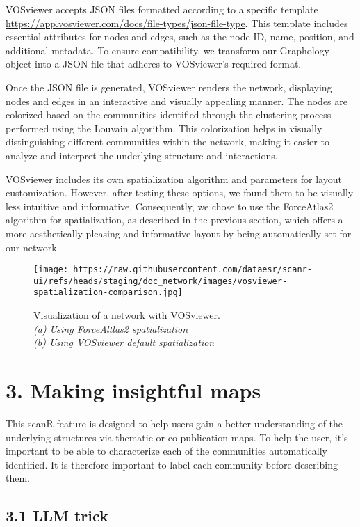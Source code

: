 \documentclass[
]{article}
\begin{document}
VOSviewer accepts JSON files formatted according to a specific template
\url{https://app.vosviewer.com/docs/file-types/json-file-type}. This
template includes essential attributes for nodes and edges, such as the
node ID, name, position, and additional metadata. To ensure
compatibility, we transform our Graphology object into a JSON file that
adheres to VOSviewer's required format.

Once the JSON file is generated, VOSviewer renders the network,
displaying nodes and edges in an interactive and visually appealing
manner. The nodes are colorized based on the communities identified
through the clustering process performed using the Louvain algorithm.
This colorization helps in visually distinguishing different communities
within the network, making it easier to analyze and interpret the
underlying structure and interactions.

VOSviewer includes its own spatialization algorithm and parameters for
layout customization. However, after testing these options, we found
them to be visually less intuitive and informative. Consequently, we
chose to use the ForceAtlas2 algorithm for spatialization, as described
in the previous section, which offers a more aesthetically pleasing and
informative layout by being automatically set for our network.

\begin{figure}
\centering
\texttt{[image: https://raw.githubusercontent.com/dataesr/scanr-ui/refs/heads/staging/doc\_network/images/vosviewer-spatialization-comparison.jpg]}
\caption{Visualization of a network with VOSviewer.\\
\emph{(a) Using ForceAltlas2 spatialization\\
(b) Using VOSviewer default spatialization}}
\end{figure}

\hypertarget{making-insightful-maps}{%
\section{3. Making insightful maps}\label{making-insightful-maps}}

This scanR feature is designed to help users gain a better understanding
of the underlying structures via thematic or co-publication maps. To
help the user, it's important to be able to characterize each of the
communities automatically identified. It is therefore important to label
each community before describing them.

\hypertarget{llm-trick}{%
\subsection{3.1 LLM trick}\label{llm-trick}}
\end{document}
